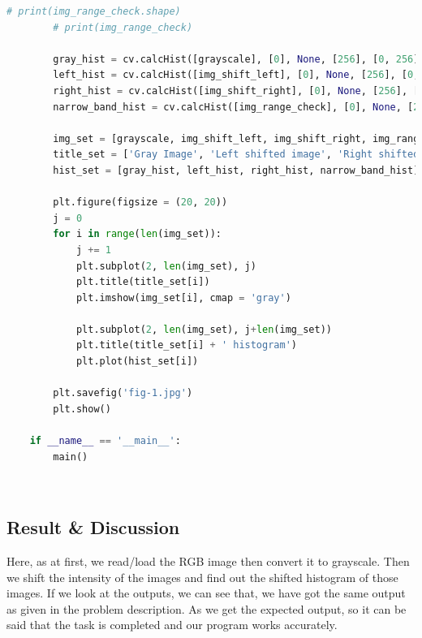\documentclass{article}
\begin{document}
{\begin{lstlisting}[language=Python, caption=Code for shifting histogram]
        # print(img_range_check.shape)
        # print(img_range_check)
    
        gray_hist = cv.calcHist([grayscale], [0], None, [256], [0, 256])
        left_hist = cv.calcHist([img_shift_left], [0], None, [256], [0, 256])
        right_hist = cv.calcHist([img_shift_right], [0], None, [256], [0, 256])
        narrow_band_hist = cv.calcHist([img_range_check], [0], None, [256], [0, 256])
    
        img_set = [grayscale, img_shift_left, img_shift_right, img_range_check]
        title_set = ['Gray Image', 'Left shifted image', 'Right shifted image', 'Narrow band image']
        hist_set = [gray_hist, left_hist, right_hist, narrow_band_hist]
    
        plt.figure(figsize = (20, 20))
        j = 0
        for i in range(len(img_set)):
            j += 1
            plt.subplot(2, len(img_set), j)
            plt.title(title_set[i])
            plt.imshow(img_set[i], cmap = 'gray')
    
            plt.subplot(2, len(img_set), j+len(img_set))
            plt.title(title_set[i] + ' histogram')
            plt.plot(hist_set[i])
    
        plt.savefig('fig-1.jpg')
        plt.show()
    
    if __name__ == '__main__':
        main()

    \end{lstlisting}
    \\
    
    \subsection{Result & Discussion}{
        Here, as at first, we read/load the RGB image then convert it to grayscale. Then we shift the intensity of the images and find out the shifted histogram of those images. If we look at the outputs, we can see that, we have got the same output as given in the problem description. As we get the expected output, so it can be said that the task is completed and our program works accurately.
        
}}
\end{document}
